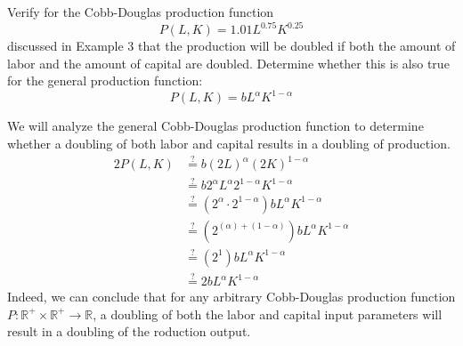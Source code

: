 \begin{exercise}
	Verify for the Cobb-Douglas production function
	\begin{equation*}
	P\left( L, K \right) = 1.01L^{0.75}K^{0.25}
	\end{equation*}
	discussed in Example 3 that the production will be doubled if both the amount of labor and the amount of capital are doubled. Determine whether this is also true for the general production function:
	\begin{equation}
	\label{equation-Cobb-Douglas}
	P\left( L, K \right) = bL^{\alpha}K^{1-\alpha}
	\end{equation}
\end{exercise}
\begin{solution}
	We will analyze the general Cobb-Douglas production function to determine whether a doubling of both labor and capital results in a doubling of production.
	\begin{align*}
	2 P\left( L, K \right) &\overset{?}{=} b \left( 2L \right)^{\alpha} \left( 2K \right)^{1 - \alpha} \\
	&\overset{?}{=} b2^{\alpha}L^{\alpha}2^{1-\alpha}K^{1-\alpha} \\
	&\overset{?}{=} \left( 2^{\alpha} \cdot 2^{1-\alpha} \right) bL^{\alpha}K^{1-\alpha} \\
	&\overset{?}{=} \left( 2^{\left( \alpha \right) + \left( 1 - \alpha \right)} \right) bL^{\alpha}K^{1-\alpha} \\
	&\overset{?}{=} \left( 2^{1} \right) bL^{\alpha}K^{1-\alpha} \\
	&\overset{?}{=} 2bL^{\alpha}K^{1-\alpha}
	\end{align*}
	Indeed, we can conclude that for any arbitrary Cobb-Douglas production function $P : \mathbb{R}^{+} \times \mathbb{R}^{+} \to \mathbb{R}$, a doubling of both the labor and capital input parameters will result in a doubling of the roduction output.
\end{solution}
